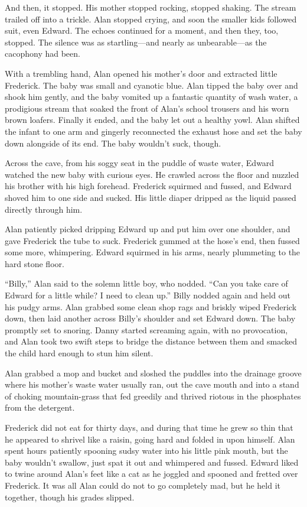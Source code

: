 \documentclass{article}
\begin{document}
And then, it stopped.  His mother stopped rocking, stopped shaking. 
The stream trailed off into a trickle.  Alan stopped crying, and soon
the smaller kids followed suit, even Edward.  The echoes continued for
a moment, and then they, too, stopped.  The silence was as
startling---and nearly as unbearable---as the cacophony had been.

With a trembling hand, Alan opened his mother's door and extracted
little Frederick.  The baby was small and cyanotic blue.  Alan tipped
the baby over and shook him gently, and the baby vomited up a
fantastic quantity of wash water, a prodigious stream that soaked the
front of Alan's school trousers and his worn brown loafers.  Finally
it ended, and the baby let out a healthy yowl.  Alan shifted the
infant to one arm and gingerly reconnected the exhaust hose and set
the baby down alongside of its end.  The baby wouldn't suck, though.

Across the cave, from his soggy seat in the puddle of waste water,
Edward watched the new baby with curious eyes.  He crawled across the
floor and nuzzled his brother with his high forehead.  Frederick
squirmed and fussed, and Edward shoved him to one side and sucked. 
His little diaper dripped as the liquid passed directly through him.

Alan patiently picked dripping Edward up and put him over one
shoulder, and gave Frederick the tube to suck.  Frederick gummed at
the hose's end, then fussed some more, whimpering.  Edward squirmed in
his arms, nearly plummeting to the hard stone floor.

``Billy,'' Alan said to the solemn little boy, who nodded.  ``Can you
take care of Edward for a little while?  I need to clean up.'' Billy
nodded again and held out his pudgy arms.  Alan grabbed some clean
shop rags and briskly wiped Frederick down, then laid another across
Billy's shoulder and set Edward down.  The baby promptly set to
snoring.  Danny started screaming again, with no provocation, and Alan
took two swift steps to bridge the distance between them and smacked
the child hard enough to stun him silent.

Alan grabbed a mop and bucket and sloshed the puddles into the
drainage groove where his mother's waste water usually ran, out the
cave mouth and into a stand of choking mountain-grass that fed
greedily and thrived riotous in the phosphates from the detergent.

Frederick did not eat for thirty days, and during that time he grew so
thin that he appeared to shrivel like a raisin, going hard and folded
in upon himself.  Alan spent hours patiently spooning sudsy water into
his little pink mouth, but the baby wouldn't swallow, just spat it out
and whimpered and fussed.  Edward liked to twine around Alan's feet
like a cat as he joggled and spooned and fretted over Frederick.  It
was all Alan could do not to go completely mad, but he held it
together, though his grades slipped.
\end{document}
